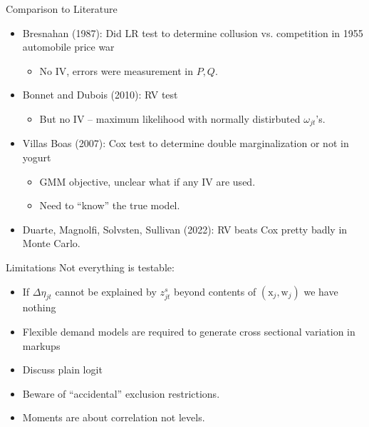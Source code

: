 \documentclass[aspectratio=169,10pt]{beamer}
\begin{document}
\begin{frame}{Comparison to Literature}
\begin{itemize}
\item Bresnahan (1987): Did LR test to determine collusion vs. competition in 1955 automobile price war
\begin{itemize}
\item No IV, errors were measurement in $P,Q$.
\end{itemize}
\item Bonnet and Dubois (2010): RV test
\begin{itemize}
\item But no IV -- maximum likelihood with normally distirbuted $\omega_{jt}$'s.
\end{itemize}
\item Villas Boas (2007): Cox test to determine double marginalization or not in yogurt
\begin{itemize}
\item GMM objective, unclear what if any IV are used.
\item Need to ``know'' the true model.
\end{itemize}
\item Duarte, Magnolfi, Solvsten, Sullivan (2022): RV beats Cox pretty badly in Monte Carlo.
\end{itemize}
\end{frame}



\begin{frame}[plain]{Limitations}
Not everything is testable:
\begin{itemize}
\item If $\Delta \eta_{jt}$ cannot be explained by $z_{jt}^s$ beyond contents of $(\mathrm{x}_j,\mathrm{w}_j)$ we have nothing
\item Flexible demand models are required to generate cross sectional variation in markups
\item Discuss plain logit
\item Beware of ``accidental'' exclusion restrictions.
\item Moments are about \alert{correlation} not \alert{levels}.
\end{itemize}
\end{frame}
\end{document}
